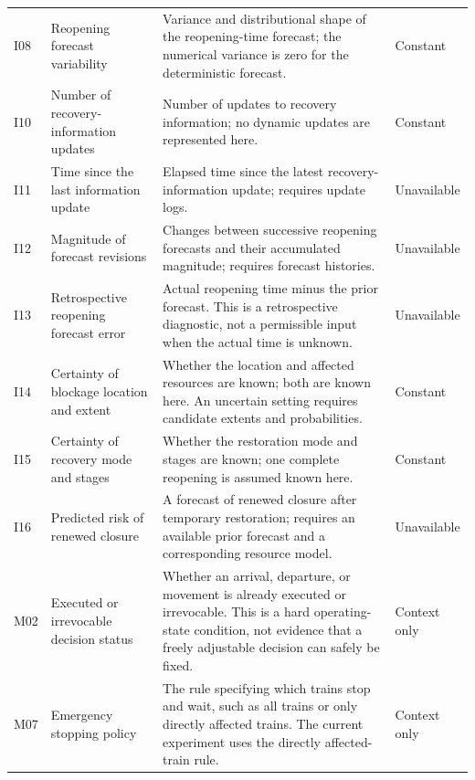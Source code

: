 \begin{longtable}{@{}>{\raggedright\arraybackslash}p{0.7cm}>{\raggedright\arraybackslash}p{3.0cm}>{\raggedright\arraybackslash}p{8.6cm}>{\raggedright\arraybackslash}p{1.9cm}@{}}
I08 & Reopening forecast variability & Variance and distributional shape of the reopening-time forecast; the numerical variance is zero for the deterministic forecast. & Constant \\

I10 & Number of recovery-information updates & Number of updates to recovery information; no dynamic updates are represented here. & Constant \\

I11 & Time since the last information update & Elapsed time since the latest recovery-information update; requires update logs. & Unavailable \\

I12 & Magnitude of forecast revisions & Changes between successive reopening forecasts and their accumulated magnitude; requires forecast histories. & Unavailable \\

I13 & Retrospective reopening forecast error & Actual reopening time minus the prior forecast. This is a retrospective diagnostic, not a permissible input when the actual time is unknown. & Unavailable \\

I14 & Certainty of blockage location and extent & Whether the location and affected resources are known; both are known here. An uncertain setting requires candidate extents and probabilities. & Constant \\

I15 & Certainty of recovery mode and stages & Whether the restoration mode and stages are known; one complete reopening is assumed known here. & Constant \\

I16 & Predicted risk of renewed closure & A forecast of renewed closure after temporary restoration; requires an available prior forecast and a corresponding resource model. & Unavailable \\

M02 & Executed or irrevocable decision status & Whether an arrival, departure, or movement is already executed or irrevocable. This is a hard operating-state condition, not evidence that a freely adjustable decision can safely be fixed. & Context only \\

M07 & Emergency stopping policy & The rule specifying which trains stop and wait, such as all trains or only directly affected trains. The current experiment uses the directly affected-train rule. & Context only \\


\end{longtable}
